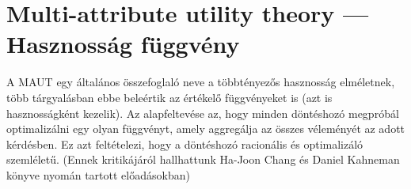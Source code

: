 \documentclass[a4paper,12pt]{article}
\begin{document}
\section{Multi-attribute utility theory --- Hasznosság függvény}
\label{sec:utility}

A MAUT egy általános összefoglaló neve a többtényezős hasznosság elméletnek, több tárgyalásban ebbe beleértik az értékelő függvényeket is (azt is hasznosságként kezelik). Az alapfeltevése az, hogy minden döntéshozó megpróbál optimalizálni egy olyan függvényt, amely aggregálja az összes véleményét az adott kérdésben. Ez azt feltételezi, hogy a döntéshozó racionális és optimalizáló szemléletű. (Ennek kritikájáról hallhattunk Ha-Joon Chang és Daniel Kahneman könyve nyomán tartott előadásokban)

\end{document}

